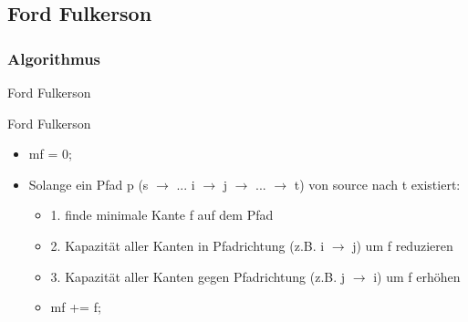 \subsection{Ford Fulkerson}
\subsubsection{Algorithmus}
\begin{frame}{Ford Fulkerson}
  \begin{block}{Ford Fulkerson}
    \begin{itemize}
      \item mf = 0;
      \pause
      \item Solange ein Pfad p (s $\rightarrow$ ... i $\rightarrow$ j $\rightarrow$ ... $\rightarrow$ t) von source nach t existiert:
      \pause
      \begin{itemize}
      \item 1. finde minimale Kante f auf dem Pfad
      \pause
      \item 2. Kapazität aller Kanten in Pfadrichtung (z.B. i $\rightarrow$ j) um f reduzieren
      \pause
      \item 3. Kapazität aller Kanten gegen Pfadrichtung (z.B. j $\rightarrow$ i) um f erhöhen 
      \pause
      \item mf += f;
      \end{itemize}
    \end{itemize}
  \end{block}
\end{frame}
